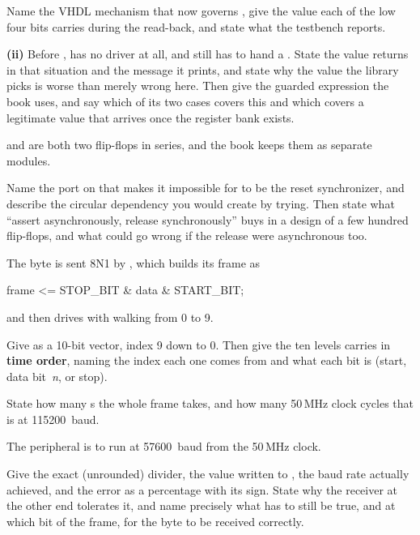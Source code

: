 Name the VHDL mechanism that now governs , give the value each of the low four bits
carries during the read-back, and state what the testbench reports. 

\medskip\noindent\textbf{(ii)} Before ,  has no driver at all, and
 still has to hand  a . State the value
 returns in that situation and the message it prints, and state
why the value the library picks is worse than merely wrong here. Then give the guarded expression
the book uses, and say which of its two cases covers this and which covers a legitimate value that
arrives once the register bank exists. 

  and  are both two flip-flops in series, and the book keeps
them as separate modules.

Name the port on  that makes it impossible for  to be the reset synchronizer,
and describe the circular dependency you would create by trying. Then state what ``assert
asynchronously, release synchronously'' buys in a design of a few hundred flip-flops, and what could
go wrong if the release were asynchronous too. 

\label{exa:q:2}

 The byte  is sent 8N1 by , which builds its frame as

\begin{vhdlcode}
frame <= STOP_BIT & data & START_BIT;
\end{vhdlcode}

\noindent and then drives  with  walking from 0 to 9.

Give  as a 10-bit vector, index 9 down to 0. Then give the ten levels  carries
in \textbf{time order}, naming the  index each one comes from and what each bit is
(start, data bit~\emph{n}, or stop).

State how many s the whole frame takes, and how many 50\,MHz clock cycles that is at
115200~baud. 

 The peripheral is to run at 57600~baud from the 50\,MHz clock.

Give the exact (unrounded) divider, the value written to , the baud rate actually
achieved, and the error as a percentage with its sign. State why the receiver at the other end
tolerates it, and name precisely what has to still be true, and at which bit of the frame, for the
byte to be received correctly. 

